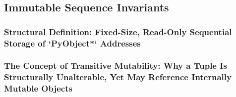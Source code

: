 \subsection{Immutable Sequence Invariants}
\subsubsection{Structural Definition: Fixed-Size, Read-Only Sequential Storage of `PyObject*` Addresses}
\subsubsection{The Concept of Transitive Mutability: Why a Tuple Is Structurally Unalterable, Yet May Reference Internally Mutable Objects}
